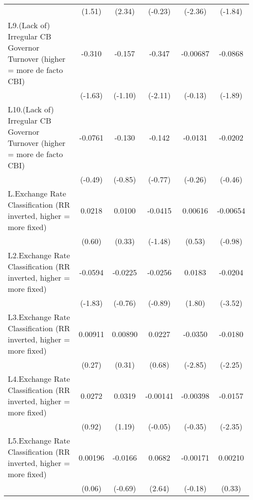 {\begin{longtable}{l*{5}{c}}
                &   (1.51)         &   (2.34)         &  (-0.23)         &  (-2.36)         &  (-1.84)         \\
[1em]
L9.(Lack of) Irregular CB Governor Turnover (higher = more de facto CBI)&   -0.310         &   -0.157         &   -0.347\sym{*}  & -0.00687         &  -0.0868         \\
                &  (-1.63)         &  (-1.10)         &  (-2.11)         &  (-0.13)         &  (-1.89)         \\
[1em]
L10.(Lack of) Irregular CB Governor Turnover (higher = more de facto CBI)&  -0.0761         &   -0.130         &   -0.142         &  -0.0131         &  -0.0202         \\
                &  (-0.49)         &  (-0.85)         &  (-0.77)         &  (-0.26)         &  (-0.46)         \\
[1em]
L.Exchange Rate Classification (RR inverted, higher = more fixed)&   0.0218         &   0.0100         &  -0.0415         &  0.00616         & -0.00654         \\
                &   (0.60)         &   (0.33)         &  (-1.48)         &   (0.53)         &  (-0.98)         \\
[1em]
L2.Exchange Rate Classification (RR inverted, higher = more fixed)&  -0.0594         &  -0.0225         &  -0.0256         &   0.0183         &  -0.0204\sym{***}\\
                &  (-1.83)         &  (-0.76)         &  (-0.89)         &   (1.80)         &  (-3.52)         \\
[1em]
L3.Exchange Rate Classification (RR inverted, higher = more fixed)&  0.00911         &  0.00890         &   0.0227         &  -0.0350\sym{**} &  -0.0180\sym{*}  \\
                &   (0.27)         &   (0.31)         &   (0.68)         &  (-2.85)         &  (-2.25)         \\
[1em]
L4.Exchange Rate Classification (RR inverted, higher = more fixed)&   0.0272         &   0.0319         & -0.00141         & -0.00398         &  -0.0157\sym{*}  \\
                &   (0.92)         &   (1.19)         &  (-0.05)         &  (-0.35)         &  (-2.35)         \\
[1em]
L5.Exchange Rate Classification (RR inverted, higher = more fixed)&  0.00196         &  -0.0166         &   0.0682\sym{**} & -0.00171         &  0.00210         \\
                &   (0.06)         &  (-0.69)         &   (2.64)         &  (-0.18)         &   (0.33)         \\

\end{longtable}}
